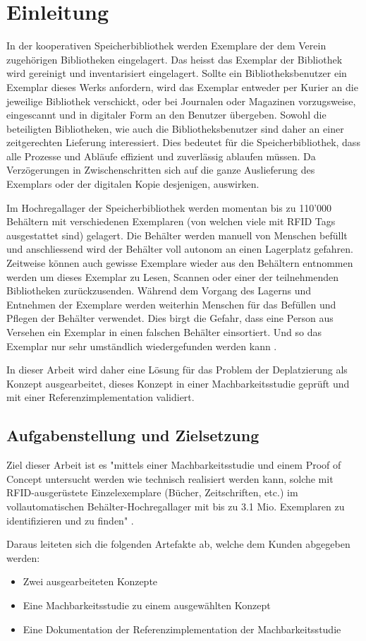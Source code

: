 \chapter{Einleitung}
In der kooperativen Speicherbibliothek werden Exemplare der dem Verein zugehörigen Bibliotheken eingelagert. Das heisst das Exemplar der Bibliothek wird gereinigt und inventarisiert eingelagert. Sollte ein Bibliotheksbenutzer ein Exemplar dieses Werks anfordern, wird das Exemplar entweder per Kurier an die jeweilige Bibliothek verschickt, oder bei Journalen oder Magazinen vorzugsweise, eingescannt und in digitaler Form an den Benutzer übergeben. Sowohl die beteiligten Bibliotheken, wie auch die Bibliotheksbenutzer sind daher an einer zeitgerechten Lieferung interessiert. Dies bedeutet für die Speicherbibliothek, dass alle Prozesse und Abläufe effizient und zuverlässig ablaufen müssen. Da Verzögerungen in Zwischenschritten sich auf die ganze Auslieferung des Exemplars oder der digitalen Kopie desjenigen, auswirken.

Im Hochregallager der Speicherbibliothek werden momentan bis zu 110'000 Behältern mit verschiedenen Exemplaren (von welchen viele mit RFID Tags ausgestattet sind) gelagert. Die Behälter werden manuell von Menschen befüllt und anschliessend wird der Behälter voll autonom an einen Lagerplatz gefahren. Zeitweise können auch gewisse Exemplare wieder aus den Behältern entnommen werden um dieses Exemplar zu Lesen, Scannen oder einer der teilnehmenden Bibliotheken zurückzusenden. Während dem Vorgang des Lagerns und Entnehmen der Exemplare werden weiterhin Menschen für das Befüllen und Pflegen der Behälter verwendet. Dies birgt die Gefahr, dass eine Person aus Versehen ein Exemplar in einen falschen Behälter einsortiert. Und so das Exemplar nur sehr umständlich wiedergefunden werden kann \parencite{WickiBaumann2019Projektbeschrieb}.

In dieser Arbeit wird daher eine Lösung für das Problem der Deplatzierung als Konzept ausgearbeitet, dieses Konzept in einer Machbarkeitsstudie geprüft und mit einer Referenzimplementation validiert.

\section{Aufgabenstellung und Zielsetzung}
Ziel dieser Arbeit ist es "mittels einer Machbarkeitsstudie und einem Proof of Concept untersucht werden wie technisch realisiert werden kann, solche mit RFID-ausgerüstete Einzelexemplare (Bücher, Zeitschriften, etc.) im vollautomatischen Behälter-Hochregallager mit bis zu 3.1 Mio. Exemplaren zu identifizieren und zu finden" \parencite{WickiBaumann2019Projektbeschrieb}.

Daraus leiteten sich die folgenden Artefakte ab, welche dem Kunden abgegeben werden:
\begin{itemize}
	\item Zwei ausgearbeiteten Konzepte
	\item Eine Machbarkeitsstudie zu einem ausgewählten Konzept
	\item Eine Dokumentation der Referenzimplementation der Machbarkeitsstudie
\end{itemize}
